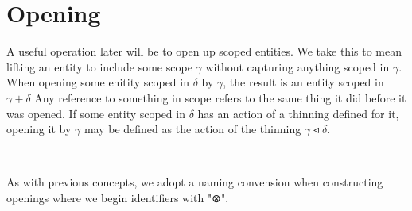 \section{Opening}
\label{sec:Opening}



A useful operation later will be to open up scoped entities. We take this
to mean lifting an entity to include some scope $γ$ without capturing
anything scoped in $γ$. When opening some enitity scoped in $δ$ by $γ$, the
result is an entity scoped in $γ + δ$ Any reference to something in
scope refers to the same thing it did before it was opened. If some entity
scoped in $δ$ has an action of a thinning defined for it, opening it by $γ$
may be defined as the action of the thinning $γ ◃ δ$.
\begin{code}%
\>[0]\AgdaSpace{}%
\AgdaSymbol{:}\AgdaSpace{}%
\AgdaSymbol{(}\AgdaSpace{}%
\AgdaSymbol{:}\AgdaSpace{}%
\AgdaSymbol{)}\AgdaSpace{}%
\AgdaSpace{}%
\<%
\\
\>[0]\AgdaSpace{}%
\AgdaSpace{}%
\AgdaSymbol{=}\AgdaSpace{}%
\AgdaSpace{}%
\AgdaSymbol{\{}\AgdaSymbol{\}}\AgdaSpace{}%
\AgdaSpace{}%
\AgdaSymbol{(}\AgdaSpace{}%
\AgdaSymbol{:}\AgdaSpace{}%
\AgdaSymbol{)}\AgdaSpace{}%
\AgdaSpace{}%
\AgdaSpace{}%
\AgdaSpace{}%
\AgdaSpace{}%
\AgdaSpace{}%
\AgdaSymbol{(}\AgdaSpace{}%
\AgdaOperator{\AgdaPrimitive{+}}\AgdaSpace{}%
\AgdaSymbol{)}\<%
\end{code}
As with previous concepts, we adopt a naming convension when constructing
openings where we begin identifiers with "⊗".
